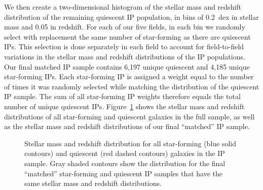 We then create a two-dimensional histogram of the stellar mass and redshift distribution of the remaining quiescent IP population, in bins of 0.2~dex in stellar mass and 0.05 in redshift.
For each of our five fields, in each bin we randomly select with replacement the same number of star-forming as there are quiescent IPs.
This selection is done separately in each field to account for field-to-field variations in the stellar mass and redshift distributions of the IP populations.
Our final matched IP sample contains 6,197 unique quiescent and 4,185 unique star-forming IPs.
Each star-forming IP is assigned a weight equal to the number of times it was randomly selected while matching the distribution of the quiescent IP sample.
The sum of all star-forming IP weights therefore equals the total number of unique quiescent IPs.
Figure~\ref{fig:IPsample_matched} shows the stellar mass and redshift distributions of all star-forming and quiescent galaxies in the full sample, as well as the stellar mass and redshift distributions of our final ``matched'' IP sample.

\begin{figure}
  \epstrim{0.6in 0.2in 0.2in 0.4in}
  \caption{Stellar mass and redshift distribution for all star-forming (blue solid contours) and quiescent (red dashed contours) galaxies in the IP sample. 
Gray shaded contours show the distribution for the final ``matched'' star-forming and quiescent IP samples that have the same stellar mass and redshift distributions.
}
  \label{fig:IPsample_matched}
\end{figure}

